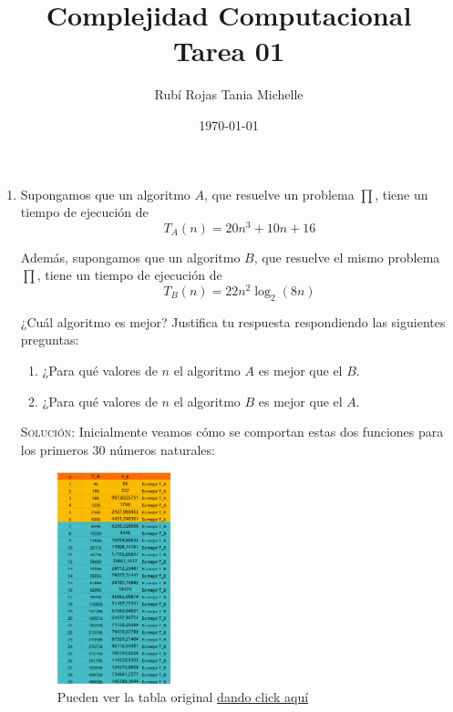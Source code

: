 \documentclass[letterpaper,11pt]{article}
\title{Complejidad Computacional \\ Tarea 01}
\author{Rubí Rojas Tania Michelle}
\date{\today}
\begin{document}
\maketitle

\begin{enumerate}
    \item Supongamos que un algoritmo $A$, que resuelve un problema $\prod$, 
    tiene un tiempo de ejecución de 
    \begin{equation*}
        T_A(n) = 20n^3 + 10n + 16
    \end{equation*} 
    
    Además, supongamos que un algoritmo $B$, que resuelve el mismo problema 
    $\prod$, tiene un tiempo de ejecución de 
    \begin{equation*}
        T_B(n) = 22n^2 \log_2 (8n)
    \end{equation*} 
    
    ¿Cuál algoritmo es mejor? Justifica tu respuesta respondiendo las 
    siguientes preguntas:
    \begin{enumerate}
        \item ¿Para qué valores de $n$ el algoritmo $A$ es mejor que el $B$.
        \item ¿Para qué valores de $n$ el algoritmo $B$ es mejor que el $A$. 
    \end{enumerate}

    \textsc{Solución:} Inicialmente veamos cómo se comportan estas dos 
    funciones para los primeros $30$ números naturales:
    \begin{figure}[htb]
        \centering
        \includegraphics[width=0.31\textwidth]{img/img1.png}
        \caption{Pueden ver la tabla original 
        \href{https://docs.google.com/spreadsheets/d/1dJZr9smxsGQyZ_ItOEklaM7aGh7erAAA3SLIZ5G13YY/edit?usp=sharing}
        {dando click aquí}}
    \end{figure}


\end{enumerate}
\end{document}
